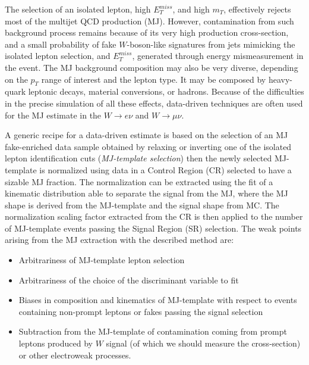 The selection of an isolated lepton, high $E_T^{miss}$, and high $m_T$, effectively rejects most of the multijet QCD production (MJ).
However, contamination from such background process remains because of its very high production cross-section, and a small probability of fake $W$-boson-like signatures from jets mimicking the isolated lepton selection, and $E_T^{miss}$,  generated through energy mismeasurement in the event.
The MJ background composition may also be very diverse, depending on the $p_T$ range of interest and the lepton type.
It may be composed by heavy-quark leptonic decays, material conversions, or hadrons.
Because of the difficulties in the precise simulation of all these effects, data-driven techniques are often used for the MJ estimate in the $W \rightarrow e\nu$ and $W \rightarrow \mu\nu$. 

A generic recipe for a data-driven estimate is based on the selection of an MJ fake-enriched data sample obtained by relaxing or inverting one of the isolated lepton identification cuts (\textit{MJ-template selection}) then the newly selected MJ-template is normalized using data in a Control Region (CR) selected to have a sizable MJ fraction.
The normalization can be extracted using the fit of a kinematic distribution able to separate the signal from the MJ, where the MJ shape is derived from the MJ-template and the signal shape from MC.
The normalization scaling factor extracted from the CR is then applied to the number of MJ-template events passing the Signal Region (SR) selection.
The weak points arising from the MJ extraction with the described method are:
\begin{itemize}
\item Arbitrariness of MJ-template lepton selection
\item Arbitrariness of the choice of the discriminant variable to fit
\item Biases in composition and kinematics of MJ-template with respect to events containing non-prompt leptons or fakes passing the signal selection
\item Subtraction from the MJ-template of contamination coming from prompt leptons produced by $W$ signal (of which we should measure the cross-section) or other electroweak processes.
\end{itemize}




